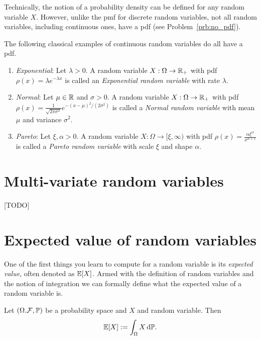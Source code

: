 Technically, the notion of a probability density can be defined for any random variable $X$. However, unlike the pmf for discrete random variables, not all random variables, including continuous ones, have a pdf (see Problem~\ref{prb:no_pdf}).

The following classical examples of continuous random variables do all have a pdf.

\begin{example}\hfill
\begin{enumerate}[label=(\alph*)]
\item \textit{Exponential}: Let $\lambda > 0$. A random variable $X : \Omega \to \mathbb R_+$ with pdf $\rho(x) = \lambda e^{-\lambda x}$ is called an \emph{Exponential random variable} with rate $\lambda$.
\item \textit{Normal}: Let $\mu \in \mathbb R$ and $\sigma > 0$. A random variable $X : \Omega \to \mathbb R_+$ with pdf $\rho(x) = \frac{1}{\sqrt{2 \pi \sigma^2}} e^{-(x - \mu)^2/(2\sigma^2)}$ is called a \emph{Normal random variable} with mean $\mu$ and variance $\sigma^2$.
\item \textit{Pareto}: Let $\xi, \alpha > 0$. A random variable $X : \Omega \to [\xi, \infty)$ with pdf $\rho(x) = \frac{\alpha \xi^\alpha}{x^{\alpha +1}}$ is called a \emph{Pareto random variable} with scale $\xi$ and shape $\alpha$.
\end{enumerate} 
\end{example}

\section{Multi-variate random variables}

[TODO]

\section{Expected value of random variables}

One of the first things you learn to compute for a random variable is its \emph{expected value}, often denoted as $\mathbb E[X]$. Armed with the definition of random variables and the notion of integration we can formally define what the expected value of a random variable is.

\begin{definition}\label{def:expectation_random_variable}
Let $(\Omega. \mathcal F, \mathbb P)$ be a probability space and $X$ and random variable. Then
\[
	\mathbb E[X] := \int_\Omega X \, \mathrm{d} \mathbb P.
\]
\end{definition}



